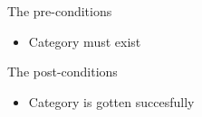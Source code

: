 The pre-conditions
\begin{itemize}
  \item Category must exist
\end{itemize}

The post-conditions
\begin{itemize}
  \item Category is gotten succesfully
\end{itemize}







